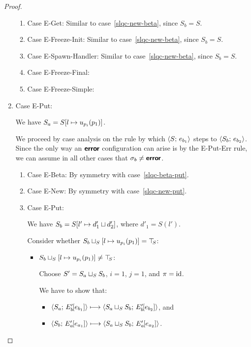\begin{proof}
\begin{enumerate}
\begin{enumerate}
    \item \label{slqc-new-get}Case {\sc E-Get}: Similar to
      case~\ref{slqc-new-beta}, since $S_b = S$.
    \item \label{slqc-new-freeze-init}Case {\sc E-Freeze-Init}:
      Similar to case~\ref{slqc-new-beta}, since $S_b = S$.
    \item \label{slqc-new-spawn-handler}Case {\sc E-Spawn-Handler}:
      Similar to case~\ref{slqc-new-beta}, since $S_b = S$.
    \item \label{slqc-new-freeze-final}Case {\sc E-Freeze-Final}: \TODO{}
    \item \label{slqc-new-freeze-simple}Case {\sc E-Freeze-Simple}: \TODO{}

    \end{enumerate}
  \item Case {\sc E-Put}:


    We have $S_a = S[l \mapsto u_{p_i}(p_1)]$.

    We proceed by case analysis on the rule by which
    $\langle S;\, e_{b_1} \rangle$ steps to $\langle S_b;\, e_{b_2} \rangle$.  Since the
    only way an $\textbf{\textsf{error}}$ configuration can arise is by the {\sc
      E-Put-Err} rule, we can assume in all other cases that $\sigma_b
    \neq \textbf{\textsf{error}}$.
    \begin{enumerate}
    \item \label{slqc-put-beta}Case {\sc E-Beta}: By symmetry with case~\ref{slqc-beta-put}.
    \item \label{slqc-put-new}Case {\sc E-New}: By symmetry with case~\ref{slqc-new-put}.
    \item \label{slqc-put-put}Case {\sc E-Put}:


      We have $S_b = S[l' \mapsto d'_1 \sqcup d'_2]$, where
      $d'_1 = S(l')$.

      Consider whether
      $S_b \sqcup_{S} \left[ l \mapsto u_{p_i}(p_1) \right]
      = \top\hspace{-0.85mm}_{S}$:

      \begin{itemize}
      \item
        $S_b \sqcup_{S} \left[ l \mapsto u_{p_i}(p_1) \right]
        \neq \top\hspace{-0.85mm}_{S}$:

        Choose $S' = S_a \sqcup_{S} S_b$, $i = 1$, $j = 1$, and $\pi =
        \mathrm{id}$.

        We have to show that:
        \begin{itemize}
        \item $\langle S_a;\, E'_b\hspace{-1mm}\left[e_{b_1}\right] \rangle \longmapsto
          \langle S_a \sqcup_{S} S_b;\, E'_b\hspace{-1mm}\left[e_{b_2}\right] \rangle$, and
        \item $\langle S_b;\, E'_a\hspace{-1mm}\left[e_{a_1}\right] \rangle \longmapsto
          \langle S_a \sqcup_{S} S_b;\, E'_a\hspace{-1mm}\left[e_{a_2}\right] \rangle$.
        \end{itemize}


\end{itemize}
\end{enumerate}
\end{enumerate}
\end{proof}
